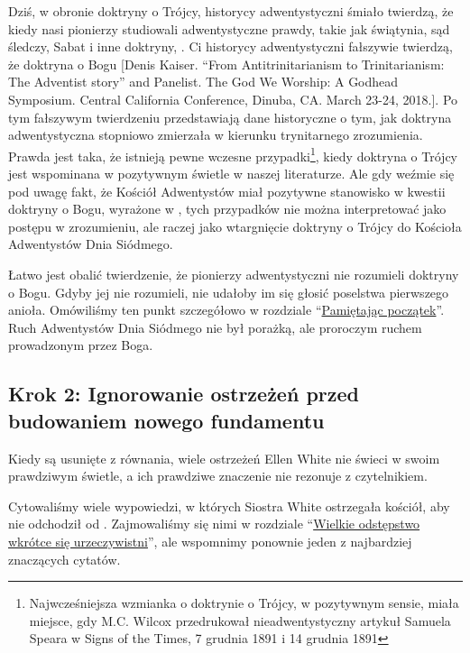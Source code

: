Dziś, w obronie doktryny o Trójcy, historycy adwentystyczni śmiało twierdzą, że kiedy nasi pionierzy studiowali adwentystyczne prawdy, takie jak świątynia, sąd śledczy, Sabat i inne doktryny, . Ci historycy adwentystyczni fałszywie twierdzą, że doktryna o Bogu [Denis Kaiser. “From Antitrinitarianism to Trinitarianism: The Adventist story” and Panelist. The God We Worship: A Godhead Symposium. Central California Conference, Dinuba, CA. March 23-24, 2018.]. Po tym fałszywym twierdzeniu przedstawiają dane historyczne o tym, jak doktryna adwentystyczna stopniowo zmierzała w kierunku trynitarnego zrozumienia. Prawda jest taka, że istnieją pewne wczesne przypadki\footnote{Najwcześniejsza wzmianka o doktrynie o Trójcy, w pozytywnym sensie, miała miejsce, gdy M.C. Wilcox przedrukował nieadwentystyczny artykuł Samuela Speara w Signs of the Times, 7 grudnia 1891 i 14 grudnia 1891}, kiedy doktryna o Trójcy jest wspominana w pozytywnym świetle w naszej literaturze. Ale gdy weźmie się pod uwagę fakt, że Kościół Adwentystów miał pozytywne stanowisko w kwestii doktryny o Bogu, wyrażone w , tych przypadków nie można interpretować jako postępu w zrozumieniu, ale raczej jako wtargnięcie doktryny o Trójcy do Kościoła Adwentystów Dnia Siódmego.

Łatwo jest obalić twierdzenie, że pionierzy adwentystyczni nie rozumieli doktryny o Bogu. Gdyby jej nie rozumieli, nie udałoby im się głosić poselstwa pierwszego anioła. Omówiliśmy ten punkt szczegółowo w rozdziale “\hyperref[chap:remembering-the-beginning]{Pamiętając początek}”. Ruch Adwentystów Dnia Siódmego nie był porażką, ale proroczym ruchem prowadzonym przez Boga.

\subsection*{Krok 2: Ignorowanie ostrzeżeń przed budowaniem nowego fundamentu}
Kiedy  są usunięte z równania, wiele ostrzeżeń Ellen White nie świeci w swoim prawdziwym świetle, a ich prawdziwe znaczenie nie rezonuje z czytelnikiem.

Cytowaliśmy wiele wypowiedzi, w których Siostra White ostrzegała kościół, aby nie odchodził od . Zajmowaliśmy się nimi w rozdziale “\hyperref[chap:apostasy]{Wielkie odstępstwo wkrótce się urzeczywistni}”, ale wspomnimy ponownie jeden z najbardziej znaczących cytatów.

